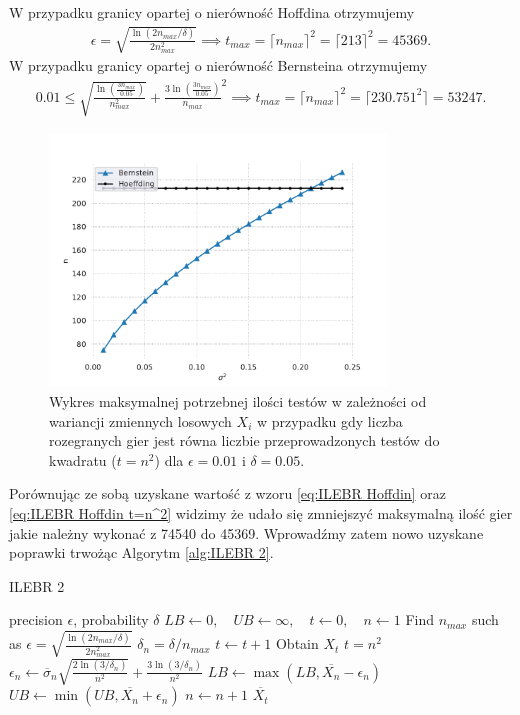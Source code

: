 \documentclass[inzynierska]{pwr_wmat_praca_dyplomowa}
\theoremstyle{plain}
\numberwithin{theorem}{chapter}
\theoremstyle{definition}
\numberwithin{theorem}{chapter}
\begin{document}
	W przypadku granicy opartej o nierówność Hoffdina otrzymujemy
	\begin{gather}
		\label{eq:ILEBR Hoffdin t=n^2}
		\epsilon =  \sqrt{\frac{\ln(2n_{max}/\delta)}{2n_{max}^2}} \implies t_{max} = \lceil n_{max} \rceil^2 = \lceil213\rceil^2= 45369.
	\end{gather}
	W przypadku granicy opartej o nierówność Bernsteina otrzymujemy
	\begin{gather}
		\label{eq:ILEBR Bernstein t=n^2}
		0.01 \le \sqrt{\frac{\ln(\frac{3n_{max}}{0.05})}{n_{max}^2}} + \frac{3  \ln(\frac{3n_{max}}{0.05})}{n_{max}}^2\implies t_{max} = \lceil n_{max} \rceil^2 = \lceil230.751^2\rceil= 53247. 
	\end{gather}
	\begin{figure}
		\centering
		\includegraphics[width=0.8\textwidth]{imagens/t_eq_n_q.pdf}
		\caption{Wykres maksymalnej potrzebnej ilości testów w zależności od wariancji zmiennych losowych  $X_i$ w przypadku gdy liczba rozegranych gier jest równa liczbie przeprowadzonych testów do kwadratu ($t = n^2$) dla $\epsilon=0.01$ i $\delta = 0.05$.}
		\label{fig:t_eq_n_q}
	\end{figure}
	Porównując ze sobą uzyskane wartość z wzoru \eqref{eq:ILEBR Hoffdin} oraz \eqref{eq:ILEBR Hoffdin t=n^2} widzimy że udało się zmniejszyć maksymalną ilość gier jakie należny wykonać z 74540 do 45369.
	Wprowadźmy zatem nowo uzyskane poprawki trwożąc Algorytm \ref{alg:ILEBR 2}.
	\begin{algorithm}[H]
		\caption{ILEBR 2}\label{alg:ILEBR 2}
		\begin{algorithmic}
			\Ensure precision $\epsilon$, probability $\delta$
			\State $LB \gets 0, \quad UB \gets \infty, \quad t \gets 0,\quad n \gets 1$
			\State Find $n_{max}$ such as $		\epsilon =  \sqrt{\frac{\ln(2n_{max}/\delta)}{2n_{max}^2}} $
			\Statex $\delta_n = \delta/n_{max}$
			\Repeat 
			\State $t \gets t + 1$
			\State Obtain $X_t$
			\Until $t=n^2$
			\State $\epsilon_n \gets \overline{\sigma}_n \sqrt{\frac{2\ln(3/\delta_n)}{n^2}} + \frac{3  \ln{(3 / \delta_n)}}{n^2}$ 
			\State $LB \gets \max(LB,  \overline{X_n} - \epsilon_n)$
			\State $UB \gets \min(UB,  \overline{X_n} + \epsilon_n)$
			\State $n \gets n + 1$
			\EndWhile
			\State \Return $ \overline{X_t}$		
		\end{algorithmic}
	\end{algorithm}
\end{document}
